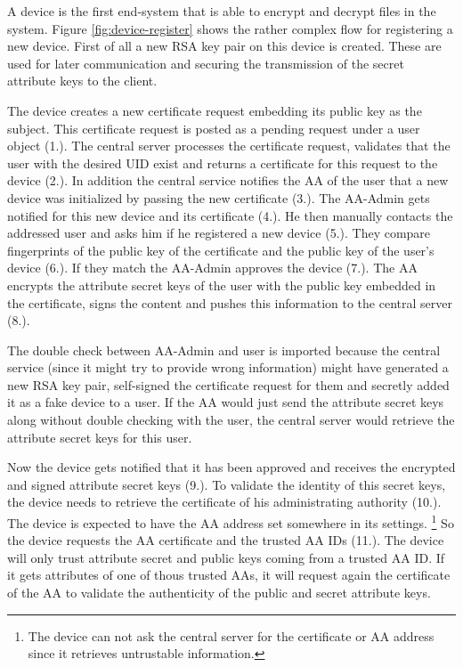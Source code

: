 A device is the first end-system that is able to encrypt and decrypt files in the system. Figure \ref{fig:device-register} shows the rather complex flow for registering a new device. First of all a new RSA key pair on this device is created. These are used for later communication and securing the transmission of the secret attribute keys to the client. 

The device creates a new certificate request embedding its public key as the subject. This certificate request is posted as a pending request under a user object (1.). The central server processes the certificate request, validates that the user with the desired UID exist and returns a certificate for this request to the device (2.). In addition the central service notifies the AA of the user that a new device was initialized by passing the new certificate (3.). The AA-Admin gets notified for this new device and its certificate (4.). He then manually contacts the addressed user and asks him if he registered a new device (5.). They compare fingerprints of the public key of the certificate and the public key of the user’s device (6.). If they match the AA-Admin approves the device (7.). The AA encrypts the attribute secret keys of the user with the public key embedded in the certificate, signs the content and pushes this information to the central server (8.). 

The double check between AA-Admin and user is imported because the central service (since it might try to provide wrong information) might have generated a new RSA key pair, self-signed the certificate request for them and secretly added it as a fake device to a user. If the AA would just send the attribute secret keys along without double checking with the user, the central server would retrieve the attribute secret keys for this user. 

Now the device gets notified that it has been approved and receives the encrypted and signed attribute secret keys (9.). To validate the identity of this secret keys, the device needs to retrieve the certificate of his administrating authority (10.). The device is expected to have the AA address set somewhere in its settings. \footnote{The device can not ask the central server for the certificate or AA address since it retrieves untrustable information.} So the device requests the AA certificate and the trusted AA IDs (11.). The device will only trust attribute secret and public keys coming from a trusted AA ID. If it gets attributes of one of thous trusted AAs, it will request again the certificate of the AA to validate the authenticity of the public and secret attribute keys. 

